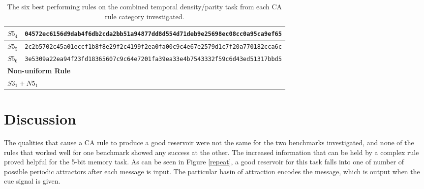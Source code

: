 \documentclass{elsarticle}
\begin{document}
\begin{multicols}{2}
\begin{table}[!htbp]
\begin{tabular}{|p{2cm}|l|}
\\ \hline
$S5_{4}$  &
\verb|04572ec6156d9dab4f6db2cda2bb51a94877dd8d554d71deb9e25698ec08cc0a95ca9ef65| 
\\ \hline
$S5_{5}$ &
\verb|2c2b5702c45a01eccf1b8f8e29f2c4199f2ea0fa00c9c4e67e2579d1c7f20a770182cca6c| 
\\ \hline
$S5_{6}$ &
\verb|3e5309a22ea94f23fd18365607c9c64e7201fa39ea33e4b7543332f59c6d43ed51317bbd5| 
\\ \hline
\multicolumn{2}{|l|}{\textbf{Non-uniform Rule}} \\ \hline
\multicolumn{2}{|l|}{$S3_{1} + N5_{1}$} \\ \hline 
\end{tabular}
\caption{The six best performing rules on the combined temporal density/parity 
   task from each CA rule category investigated.}
\label{table:rules_temp_dens}
\end{table}


\section{Discussion}\label{discussion}
The qualities that cause a CA rule to produce a good reservoir were not the 
   same for the two benchmarks investigated, and none of the rules that worked 
   well for one benchmark showed any success at the other. The increased 
   information that can be held by a complex rule proved helpful for the 5-bit 
   memory task. As can be seen in Figure \ref{repeat}, a good reservoir for 
   this task falls into one of number of possible  periodic attractors after 
   each message is input. The particular basin of attraction encodes the 
   message, which is output when the cue signal is given. 
   

\end{multicols}
\end{document}
